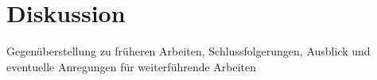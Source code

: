 \chapter{Diskussion}
\label{ch:diskussion}

Gegenüberstellung zu früheren Arbeiten, Schlussfolgerungen, Ausblick und eventuelle Anregungen für weiterführende Arbeiten
